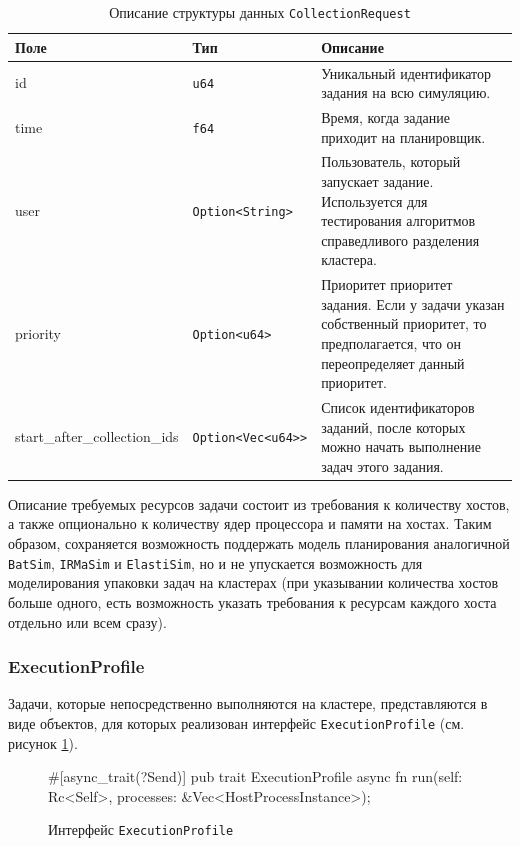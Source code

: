 \begin{table}[h!]
    \centering
    \begin{tabular}{|l|l|p{8cm}|}
        \hline
        \textbf{Поле} & \textbf{Тип} & \textbf{Описание} \\ 
        \hline
        id & \texttt{u64} & Уникальный идентификатор задания на всю симуляцию. \\
        \hline
        time & \texttt{f64} & Время, когда задание приходит на планировщик. \\
        \hline
        user & \texttt{Option<String>} & Пользователь, который запускает задание. Используется для тестирования алгоритмов справедливого разделения кластера. \\
        \hline
        priority & \texttt{Option<u64>} & Приоритет приоритет задания. Если у задачи указан собственный приоритет, то предполагается, что он переопределяет данный приоритет. \\
        \hline
        start\_after\_collection\_ids & \texttt{Option<Vec<u64>>} & Список идентификаторов заданий, после которых можно начать выполнение задач этого задания. \\
        \hline
    \end{tabular}
    \caption{Описание структуры данных \texttt{CollectionRequest}}
    \label{tab:collection}
\end{table}

Описание требуемых ресурсов задачи состоит из требования к количеству хостов, а также опционально к количеству ядер процессора и памяти на хостах. Таким образом, сохраняется возможность поддержать модель планирования аналогичной \texttt{BatSim}, \texttt{IRMaSim} и \texttt{ElastiSim}, но и не упускается возможность для моделирования упаковки задач на кластерах (при указывании количества хостов больше одного,  есть возможность указать требования к ресурсам каждого хоста отдельно или всем сразу).

\subsubsection{ExecutionProfile}\label{sec:execution-profile}

Задачи, которые непосредственно выполняются на кластере, представляются в виде объектов, для которых реализован интерфейс \texttt{ExecutionProfile} (см. рисунок \ref{fig:execution-profile-interface}).

\begin{figure}[h!]
    \small
\begin{rustcode}
#[async_trait(?Send)]
pub trait ExecutionProfile {
  async fn run(self: Rc<Self>, processes: &Vec<HostProcessInstance>);
}
\end{rustcode}
\caption{Интерфейс \texttt{ExecutionProfile}}
\label{fig:execution-profile-interface}
\end{figure}

